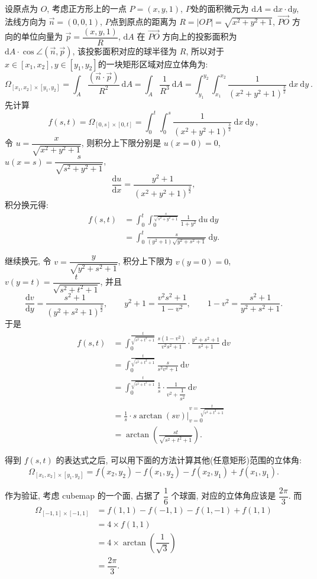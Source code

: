 设原点为 $O$, 考虑正方形上的一点 $P=(x,y,1)$, 
$P$处的面积微元为 $\mathrm{d}A = \mathrm{d}x\cdot\mathrm{d}y$, 法线方向为 $\vec{n} = (0,0,1)$, 
$P$点到原点的距离为 $R = |OP| = \sqrt{x^2+y^2+1}$, $\vec{PO}$ 方向的单位向量为 $\vec{p} = \dfrac{(x,y,1)}{R}$, 
$\mathrm{d}A$ 在 $\vec{PO}$ 方向上的投影面积为 $\mathrm{d}A\cdot\cos\angle(\vec{n},\vec{p})$, 该投影面积对应的球半径为 $R$, 所以对于 $x\in[x_1,x_2], y\in[y_1,y_2]$的一块矩形区域对应立体角为:
\[
\Omega_{[x_1,x_2]\times[y_1,y_2]} = \int_A\frac{(\vec{n}\cdot\vec{p})}{R^2} \ \mathrm{d}A = \int_A\frac{1}{R^3} \ \mathrm{d}A = \int_{y_1}^{y_2}{\int_{x_1}^{x_2}\frac{1}{(x^2+y^2+1)^{\frac{3}{2}}}\ \mathrm{d}x}\ \mathrm{d}y \ .
\]
先计算 
\[f(s,t) = \Omega_{[0,s]\times[0,t]} = \int_0^t{\int_0^s\frac{1}{(x^2+y^2+1)^{\frac{3}{2}}}\ \mathrm{d}x}\ \mathrm{d}y\ , \]
令 $u = \dfrac{x}{\sqrt{x^2+y^2+1}}$, 则积分上下限分别是 $u(x=0) = 0$, $u(x=s)=\dfrac{s}{\sqrt{s^2+y^2+1}}$, 
\[\dfrac{\mathrm{d}u}{\mathrm{d}x} = \dfrac{y^2+1}{(x^2+y^2+1)^\frac{3}{2}} ,\] 
积分换元得:
\begin{align*}
f(s,t) &= \int_0^t{\int_0^{\frac{s}{\sqrt{s^2+y^2+1}}}{\frac{1}{1+y^2}}\ \mathrm{d}u}\ \mathrm{d}y\\
&=\int_0^t{\frac{s}{(y^2+1)\sqrt{y^2+s^2+1}}}\ \mathrm{d}y . 
\end{align*}

继续换元, 令 $v = \dfrac{y}{\sqrt{y^2+s^2+1}} $, 积分上下限为 $v(y=0) = 0$, $v(y=t) = \dfrac{t}{\sqrt{s^2+t^2+1}}$, 并且
\[\frac{\mathrm{d}v}{\mathrm{d}y} = \frac{s^2+1}{(y^2+s^2+1)^\frac{3}{2}} ,\qquad y^2 + 1 = \frac{v^2s^2+1}{1-v^2} ,\qquad 1-v^2=\frac{s^2+1}{y^2+s^2+1} .\]
于是
\begin{align*}
f(s,t) &= \int_0^\frac{t}{\sqrt{s^2+t^2+1}} {\frac{s(1-v^2)}{v^2s^2+1}\cdot\frac{y^2+s^2+1}{s^2+1}}\ \mathrm{d}v \\ 
&= \int_0^\frac{t}{\sqrt{s^2+t^2+1}}{\frac{s}{s^2v^2+1}}\ \mathrm{d}v\\
&= \int_0^\frac{t}{\sqrt{s^2+t^2+1}}{\frac{1}{s}\cdot\frac{1}{v^2+\dfrac{1}{s^2}}}\ \mathrm{d}v\\
&= \frac{1}{s}\cdot s\arctan(sv)\bigg|_{v=0}^{v=\frac{t}{\sqrt{s^2+t^2+1}}}\\
&= \arctan(\frac{st}{\sqrt{s^2+t^2+1}}) .
\end{align*}

得到 $f(s,t)$ 的表达式之后, 可以用下面的方法计算其他(任意矩形)范围的立体角:
\[\Omega_{[x_1,x_2]\times[y_1,y_2]} = f(x_2,y_2) - f(x_1,y_2) - f(x_2,y_1) + f(x_1,y_1) .\]

作为验证, 考虑 cubemap 的一个面, 占据了 $\dfrac{1}{6}$ 个球面, 对应的立体角应该是 $\dfrac{2\pi}{3}$. 而
\begin{align*}
\Omega_{[-1,1]\times[-1,1]} &= f(1,1) - f(-1,1) - f(1,-1) + f(1,1) \\
& = 4\times f(1,1) \\
&= 4\times \arctan(\dfrac{1}{\sqrt{3}}) \\
& = \dfrac{2\pi}{3} .
\end{align*} 

\newpage
















